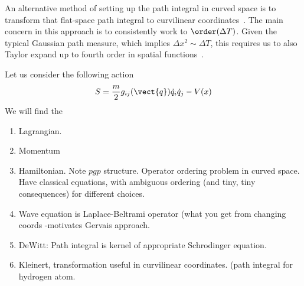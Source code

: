 An alternative method of setting up the path integral in curved space is to 
transform that flat-space path integral to curvilinear coordinates~\cite{Gervais1976,Girotti1983}.  
The main concern in this approach is to consistently work to $\order(\Delta T)$.  
Given the typical Gaussian path measure, which implies $\Delta x^2 \sim \Delta T$, 
this requires us to also Taylor expand up to fourth order in spatial 
functions~\cite{McLaughlin1971}.    

Let us consider the following action
\begin{equation}
  S = \frac{m}{2}g_{ij}(\vect{q})\dot{q}_i\dot{q}_j - V(x)
\end{equation}
We will find the 


\begin{enumerate}
\item Lagrangian.
\item Momentum
\item Hamiltonian.  Note $pgp$ structure.  Operator ordering problem in curved space.  
  Have classical equations, with ambiguous ordering (and tiny, tiny consequences)
  for different choices.  
\item Wave equation is Laplace-Beltrami operator (what you get from changing coords
  -motivates Gervais approach.  
\item DeWitt: Path integral is kernel of appropriate Schrodinger equation.
\item Kleinert, transformation useful in curvilinear coordinates. (path integral
  for hydrogen atom.
\end{enumerate}






